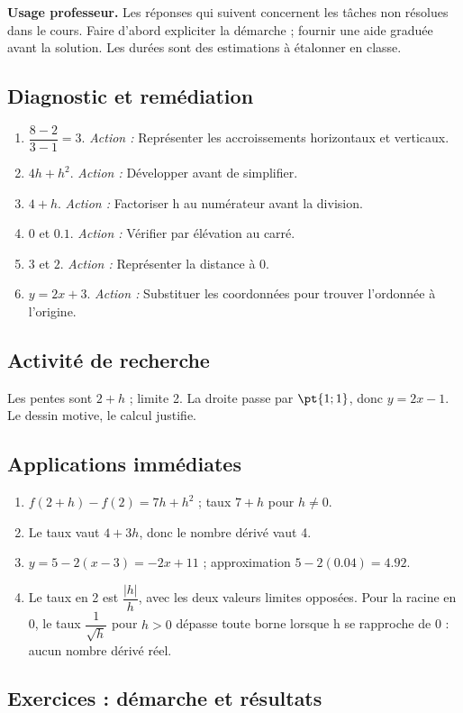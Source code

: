 \label{C04-CORR}
\textbf{Usage professeur.} Les réponses qui suivent concernent les tâches non résolues dans le cours. Faire d’abord expliciter la démarche ; fournir une aide graduée avant la solution. Les durées sont des estimations à étalonner en classe.
\subsection*{Diagnostic et remédiation}
\begin{enumerate}
\item $\dfrac{8-2}{3-1}=3$. \textit{Action :} Représenter les accroissements horizontaux et verticaux.
\item $4h+h^2$. \textit{Action :} Développer avant de simplifier.
\item $4+h$. \textit{Action :} Factoriser h au numérateur avant la division.
\item $0$ et $\num{0,1}$. \textit{Action :} Vérifier par élévation au carré.
\item $3$ et $2$. \textit{Action :} Représenter la distance à 0.
\item $y=2x+3$. \textit{Action :} Substituer les coordonnées pour trouver l’ordonnée à l’origine.
\end{enumerate}
\subsection*{Activité de recherche}
Les pentes sont $2+h$ ; limite 2. La droite passe par $\pt{1;1}$, donc $y=2x-1$. Le dessin motive, le calcul justifie.
\subsection*{Applications immédiates}
\begin{enumerate}
\item $f(2+h)-f(2)=7h+h^2$ ; taux $7+h$ pour $h\ne0$.
\item Le taux vaut $4+3h$, donc le nombre dérivé vaut 4.
\item $y=5-2(x-3)=-2x+11$ ; approximation $5-2(\num{0,04})=\num{4,92}$.
\item Le taux en 2 est $\dfrac{|h|}{h}$, avec les deux valeurs limites opposées. Pour la racine en 0, le taux $\dfrac{1}{\sqrt h}$ pour $h>0$ dépasse toute borne lorsque h se rapproche de 0 : aucun nombre dérivé réel.
\end{enumerate}
\subsection*{Exercices : démarche et résultats}
